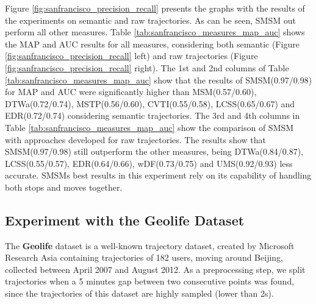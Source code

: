 \documentclass[12pt]{article}
\begin{document}
Figure {\ref{fig:sanfrancisco_precision_recall}} presents the graphs with the results of the experiments on semantic and raw trajectories. As can be seen, SMSM out perform all other measures. Table {\ref{tab:sanfrancisco_measures_map_auc}} shows the MAP and AUC results for all measures, considering both semantic (Figure \ref{fig:sanfrancisco_precision_recall} left) and raw trajectories (Figure \ref{fig:sanfrancisco_precision_recall} right). The 1st and 2nd columns of Table {\ref{tab:sanfrancisco_measures_map_auc}} show that the results of SMSM(0.97/0.98) for MAP and AUC were significantly higher than MSM(0.57/0.60), DTWa(0.72/0.74), MSTP(0.56/0.60), CVTI(0.55/0.58), LCSS(0.65/0.67) and EDR(0.72/0.74) considering semantic trajectories. The 3rd and 4th columns in Table {\ref{tab:sanfrancisco_measures_map_auc}} show the comparison of SMSM with approaches developed for	 raw trajectories. The results show that SMSM(0.97/0.98) still outperform the other measures, being DTWa(0.84/0.87), LCSS(0.55/0.57), EDR(0.64/0.66), wDF(0.73/0.75) and UMS(0.92/0.93) less accurate. SMSMs best results in this experiment rely on its capability of handling both stops and moves together.

\subsection{Experiment with the Geolife Dataset}\label{sec:geolife}

The \textbf{Geolife} dataset is a well-known trajectory dataset, created by Microsoft Research Asia \cite{zheng2009mining} containing trajectories of 182 users, moving around Beijing, collected between April 2007 and August 2012. As a preprocessing step, we split trajectories when a 5 minutes gap between two consecutive points was found, since the trajectories of this dataset are highly sampled (lower than 2s).
\end{document}
